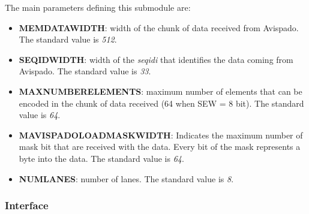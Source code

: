 The main parameters defining this submodule are:
\begin{itemize}
    \item \textbf{MEM\+DATA\+WIDTH}: width of the chunk of data received from Avispado. The standard value is \textit{512}.
    
    \item \textbf{SEQ\+ID\+WIDTH}: width of the \textit{seq\+id\+i} that identifies the data coming from Avispado. The standard value is \textit{33}.
    
    \item \textbf{MAX\+NUMBER\+ELEMENTS}: maximum number of elements that can be encoded in the chunk of data received (64 when SEW = 8 bit). The standard value is \textit{64}.
    
    \item \textbf{MAVISPADO\+LOAD\+MASK\+WIDTH}: Indicates the maximum number of mask bit that are received with the data. Every bit of the mask represents a byte into the data. The standard value is \textit{64}.
    
    \item \textbf{NUM\+LANES}: number of lanes. The standard value is \textit{8}.
\end{itemize}

\subsubsection{Interface}

